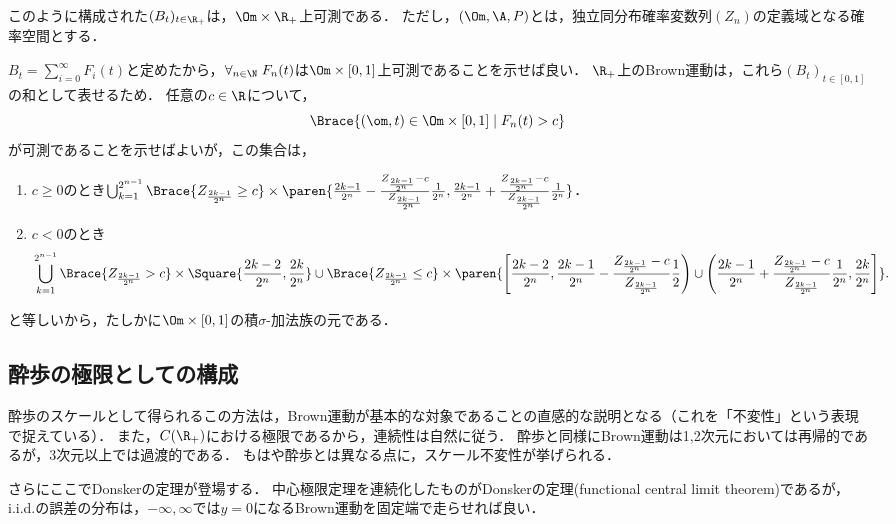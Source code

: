 \documentclass[uplatex,dvipdfmx]{jsreport}
\begin{document}
\begin{proposition}
    このように構成された$(B_t)_{t\in\R_+}$は，$\Om\times\R_+$上可測である．
    ただし，$(\Om,\A,P)$とは，独立同分布確率変数列$(Z_n)$の定義域となる確率空間とする．
\end{proposition}
\begin{Proof}
    $B_t=\sum^\infty_{i=0}F_i(t)$と定めたから，$\forall_{n\in\N}\;F_n(t)$は$\Om\times[0,1]$上可測であることを示せば良い．
    $\R_+$上のBrown運動は，これら$(B_t)_{t\in[0,1]}$の和として表せるため．
    任意の$c\in\R$について，
    \[\Brace{(\om,t)\in\Om\times[0,1]\mid F_n(t)>c}\]
    が可測であることを示せばよいが，この集合は，
    \begin{enumerate}
        \item $c\ge0$のとき$\bigcup_{k=1}^{2^{n-1}}\Brace{Z_{\frac{2k-1}{2^n}}\ge c}\times\paren{\frac{2k-1}{2^n}-\frac{Z_{\frac{2k-1}{2^n}}-c}{Z_{\frac{2k-1}{2^n}}}\frac{1}{2^n},\frac{2k-1}{2^n}+\frac{Z_{\frac{2k-1}{2^n}}-c}{Z_{\frac{2k-1}{2^n}}}\frac{1}{2^n}}$．
        \item $c<0$のとき\[\bigcup_{k=1}^{2^{n-1}}\Brace{Z_{\frac{2k-1}{2^n}}>c}\times\Square{\frac{2k-2}{2^n},\frac{2k}{2^n}}\cup\Brace{Z_{\frac{2k-1}{2^n}}\le c}\times\paren{\left[\frac{2k-2}{2^n},\frac{2k-1}{2^n}-\frac{Z_{\frac{2k-1}{2^n}}-c}{Z_{\frac{2k-1}{2^n}}}\frac{1}{2}\right)\cup\left(\frac{2k-1}{2^n}+\frac{Z_{\frac{2k-1}{2^n}}-c}{Z_{\frac{2k-1}{2^n}}}\frac{1}{2^n},\frac{2k}{2^n}\right]}.\]
    \end{enumerate}
    と等しいから，たしかに$\Om\times[0,1]$の積$\sigma$-加法族の元である．
\end{Proof}

\subsection{酔歩の極限としての構成}

\begin{tcolorbox}[colframe=ForestGreen, colback=ForestGreen!10!white,breakable,colbacktitle=ForestGreen!40!white,coltitle=black,fonttitle=\bfseries\sffamily,
title=]
    酔歩のスケールとして得られるこの方法は，Brown運動が基本的な対象であることの直感的な説明となる（これを「不変性」という表現で捉えている）．
    また，$C(\R_+)$における極限であるから，連続性は自然に従う．
    酔歩と同様にBrown運動は1,2次元においては再帰的であるが，3次元以上では過渡的である．
    もはや酔歩とは異なる点に，スケール不変性が挙げられる．

    さらにここでDonskerの定理が登場する．
    中心極限定理を連続化したものがDonskerの定理(functional central limit theorem)であるが，i.i.d.の誤差の分布は，$-\infty,\infty$では$y=0$になるBrown運動を固定端で走らせれば良い．
\end{tcolorbox}
\end{document}
